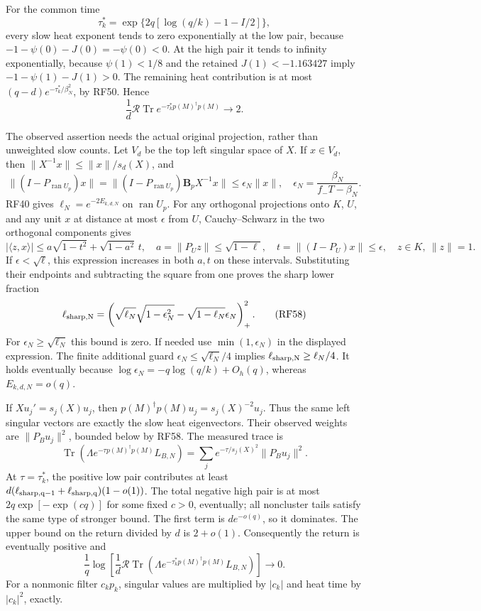 \documentclass[11pt]{article}
\begin{document}
For the common time \[
\tau_k^*=\exp\{2q[\log(q/k)-1-I/2]\},
\tag{RF55}
\] every slow heat exponent tends to zero exponentially at the low pair, because \(-1-\psi(0)-J(0)=-\psi(0)<0\). At the high pair it tends to infinity exponentially, because \(\psi(1)<1/8\) and the retained \(J(1)<-1.163427\) imply \(-1-\psi(1)-J(1)>0\). The remaining heat contribution is at most \((q-d)e^{-\tau_k^*/\beta_N^2}\), by RF50. Hence \[
\frac1d\mathcal R\operatorname{Tr}e^{-\tau_k^*p(M)^\dagger p(M)}\longrightarrow2.
\tag{RF56}
\]

The observed assertion needs the actual original projection, rather than unweighted slow counts. Let \(V_d\) be the top left singular space of \(X\). If \(x\in V_d\), then \(\|X^{-1}x\|\le\|x\|/s_d(X)\), and \[
\|(I-P_{\operatorname{ran}U_p})x\|
=\|(I-P_{\operatorname{ran}U_p})\mathbf B_pX^{-1}x\|
\le\epsilon_N\|x\|,\quad
\epsilon_N=\frac{\beta_N}{f_-T-\beta_N}.
\tag{RF57}
\] RF40 gives \(\ell_N=e^{-2E_{k,d,N}}\) on \(\operatorname{ran}U_p\). For any orthogonal projections onto \(K\), \(U\), and any unit \(x\) at distance at most \(\epsilon\) from \(U\), Cauchy--Schwarz in the two orthogonal components gives \[
|\langle z,x\rangle|\le
a\sqrt{1-t^2}+\sqrt{1-a^2}\,t,\quad
a=\|P_Uz\|\le\sqrt{1-\ell},\quad
t=\|(I-P_U)x\|\le\epsilon,\quad z\in K,\ \|z\|=1.
\] If \(\epsilon<\sqrt\ell\), this expression increases in both \(a,t\) on these intervals. Substituting their endpoints and subtracting the square from one proves the sharp lower fraction \[
\ell_{\rm sharp,N}
=\left(\sqrt{\ell_N}\sqrt{1-\epsilon_N^2}
-\sqrt{1-\ell_N}\epsilon_N\right)_+^2.
\tag{RF58}
\] For \(\epsilon_N\ge\sqrt{\ell_N}\) this bound is zero. If needed use \(\min(1,\epsilon_N)\) in the displayed expression. The finite additional guard \(\epsilon_N\le\sqrt{\ell_N}/4\) implies \(\ell_{\rm sharp,N}\ge\ell_N/4\). It holds eventually because \(\log\epsilon_N=-q\log(q/k)+O_h(q)\), whereas \(E_{k,d,N}=o(q)\).

If \(Xu_j'=s_j(X)u_j\), then \(p(M)^\dagger p(M)u_j=s_j(X)^{-2}u_j\). Thus the same left singular vectors are exactly the slow heat eigenvectors. Their observed weights are \(\|P_Bu_j\|^2\), bounded below by RF58. The measured trace is \[
\operatorname{Tr}(\Lambda e^{-\tau p(M)^\dagger p(M)}L_{B,N})
=\sum_j e^{-\tau/s_j(X)^2}\|P_Bu_j\|^2.
\tag{RF59}
\] At \(\tau=\tau_k^*\), the positive low pair contributes at least \(d(\ell_{\rm sharp,q-1}+\ell_{\rm sharp,q})(1-o(1))\). The total negative high pair is at most \(2q\exp[-\exp(cq)]\) for some fixed \(c>0\), eventually; all noncluster tails satisfy the same type of stronger bound. The first term is \(d e^{-o(q)}\), so it dominates. The upper bound on the return divided by \(d\) is \(2+o(1)\). Consequently the return is eventually positive and \[
\frac1q\log\left[
\frac1d\mathcal R\operatorname{Tr}
(\Lambda e^{-\tau_k^*p(M)^\dagger p(M)}L_{B,N})\right]\longrightarrow0.
\tag{RF60}
\] For a nonmonic filter \(c_kp_k\), singular values are multiplied by \(|c_k|\) and heat time by \(|c_k|^2\), exactly.
\end{document}
